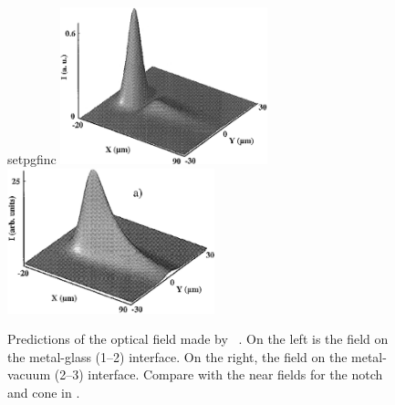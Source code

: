 \begin{figure}[ht]
\centering
{setpgfinc}
\includegraphics[keepaspectratio,width=6cm]{interference/figures/BaidaReflected.png}
\hspace{1cm}
\includegraphics[keepaspectratio,width=6cm]{interference/figures/BaidaTransmitted.png}
\caption{Predictions of the optical field made by
				~\cite{baida1999theoretical}.  On the left is the field on
				the metal-glass (1--2) interface.  On the right, the field on the
				metal-vacuum (2--3) interface.  Compare with the near fields for the
				notch and cone in .}
\label{fig:baidacompare}
\end{figure}

